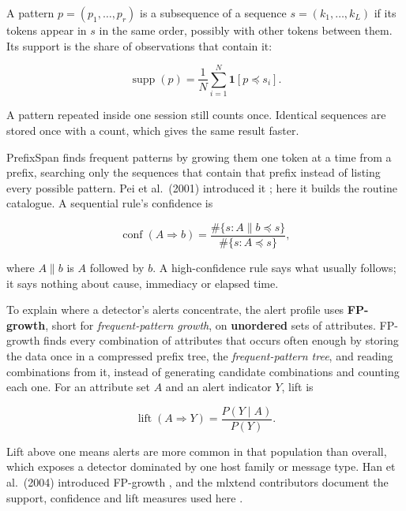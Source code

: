 \documentclass[11pt,a4paper]{article}
\begin{document}
A pattern \(p=(p_1,\ldots,p_r)\) is a subsequence of a sequence \(s=(k_1,\ldots,k_L)\) if its tokens appear in \(s\) in the same order, possibly with other tokens between them. Its support is the share of observations that contain it:

\begin{equation}
\label{eq:8}
\operatorname{supp}(p)=\frac{1}{N}\sum_{i=1}^{N}\mathbf{1}[p\preceq s_i].
\end{equation}

A pattern repeated inside one session still counts once. Identical sequences are stored once with a count, which gives the same result faster.

PrefixSpan finds frequent patterns by growing them one token at a time from a prefix, searching only the sequences that contain that prefix instead of listing every possible pattern. Pei et al.\ (2001) introduced it \cite{ref4}; here it builds the routine catalogue. A sequential rule's confidence is

\begin{equation}
\label{eq:9}
\operatorname{conf}(A\Rightarrow b)=
\frac{\#\{s:A\mathbin{\|}b\preceq s\}}{\#\{s:A\preceq s\}},
\end{equation}

where \(A\mathbin{\|}b\) is \(A\) followed by \(b\). A high-confidence rule says what usually follows; it says nothing about cause, immediacy or elapsed time.

To explain where a detector's alerts concentrate, the alert profile uses \textbf{FP-growth}, short for \emph{frequent-pattern growth}, on \textbf{unordered} sets of attributes. FP-growth finds every combination of attributes that occurs often enough by storing the data once in a compressed prefix tree, the \emph{frequent-pattern tree}, and reading combinations from it, instead of generating candidate combinations and counting each one. For an attribute set \(A\) and an alert indicator \(Y\), lift is

\begin{equation}
\label{eq:10}
\operatorname{lift}(A\Rightarrow Y)=\frac{P(Y\mid A)}{P(Y)}.
\end{equation}

Lift above one means alerts are more common in that population than overall, which exposes a detector dominated by one host family or message type. Han et al.\ (2004) introduced FP-growth \cite{ref5}, and the mlxtend contributors document the support, confidence and lift measures used here \cite{ref6}.
\end{document}
